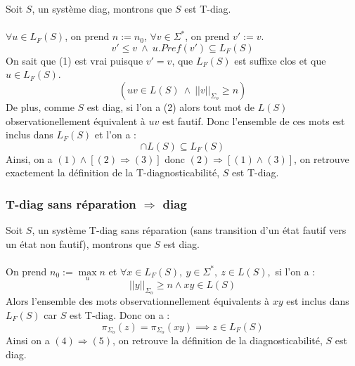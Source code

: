 \documentclass[conference]{IEEEtran}
\begin{document}
Soit $S$, un système diag, montrons que $S$ est T-diag. 
\paragraph{}
\noindent $\forall u \in L_{F}(S)$, on prend $n := n_0$, $\forall v \in \Sigma^*$, on prend $v' := v$. 
\begin{equation}
v'\leq v \ \wedge \  u.Pref(v') \subseteq L_F(S)
\end{equation}
On sait que (1) est vrai puisque $v'=v$, que $L_F(S)$ est suffixe clos et que $u \in L_F(S)$.
\begin{equation}
(uv \in L(S) \ \wedge \  ||v||_{\Sigma_o}\geq n)
\end{equation}
De plus, comme $S$ est diag, si l'on a (2) alors tout mot de $L(S)$ observationellement équivalent à $uv$ est fautif. Donc l'ensemble de ces mots est inclus dans $L_F(S)$ et l'on a :
\begin{equation}
[uv'] \cap L(S) \subseteq L_F(S)
\end{equation}
Ainsi, on a $(1) \wedge [ (2)  \Rightarrow (3) ]$ donc $(2)  \Rightarrow [ (1) \wedge (3) ]$, on retrouve exactement la définition de la T-diagnosticabilité, $S$ est T-diag.
\subsubsection{T-diag sans r\'eparation $\Rightarrow$ diag}
Soit $S$, un système T-diag sans réparation (sans transition d'un état fautif vers un état non fautif), montrons que $S$ est diag.
\paragraph{}
\noindent On prend $n_0:= \max\limits_{u} n$ et
$\forall x \in L_F(S),\ y \in \Sigma^*,\ z \in L(S),$ si l'on a :
\begin{equation}
||y||_{\Sigma_o} \ge n \land xy \in  L(S) 
\end{equation}
Alors l'ensemble des mots observationnellement équivalents à $xy$ est inclus dans $L_F(S)$ car $S$ est T-diag. Donc on a :
\begin{equation}
 \pi_{\Sigma_o}(z)=\pi_{\Sigma_o}(xy) \implies z \in L_F(S)
\end{equation}
Ainsi on a $(4) \Rightarrow (5)$, on retrouve la définition de la diagnosticabilité, $S$ est diag.
\end{document}
